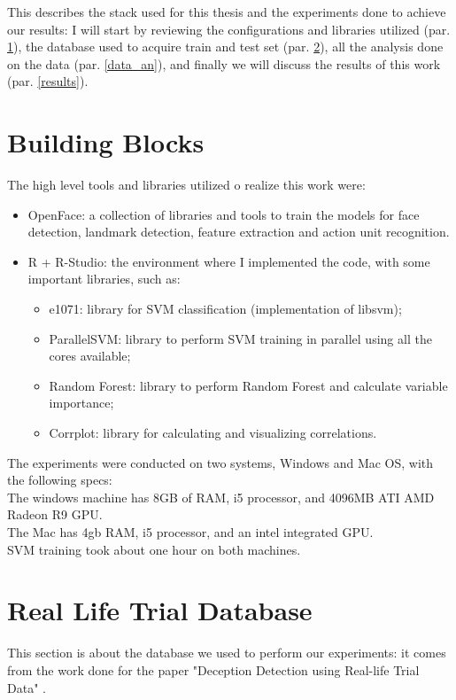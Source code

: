 This describes the stack used for this thesis and the experiments done to achieve our results: I will start by reviewing the configurations and libraries utilized (par. \ref{bb}), the database used to acquire train and test set (par. \ref{rldb}), all the analysis done on the data (par. \ref{data_an}), and finally we will discuss the results of this work (par. \ref{results}).

\section{Building Blocks} \label{bb}
The high level tools and libraries utilized o realize this work were:
\begin{itemize}
	\item OpenFace: a collection of libraries and tools to train the models for face detection, landmark detection, feature extraction and action unit recognition.
	\item R + R-Studio: the environment where I implemented the code, with some important libraries, such as:
	\begin{itemize}
		\item e1071: library for SVM classification (implementation of libsvm);
		\item ParallelSVM: library to perform SVM training in parallel using all the cores available;
		\item Random Forest: library to perform Random Forest and calculate variable importance;
		\item Corrplot: library for calculating and visualizing correlations.
	\end{itemize}
\end{itemize}

The experiments were conducted on two systems, Windows and Mac OS, with the following specs:\\
The windows machine has 8GB of RAM, i5 processor, and 4096MB ATI AMD Radeon R9 GPU. \\
The Mac has 4gb RAM, i5 processor, and an intel integrated GPU.\\
SVM training took about one hour on both machines.

\clearpage
\section{Real Life Trial Database} \label{rldb}
This section is about the database we used to perform our experiments: it comes from the work done for the paper "Deception Detection using Real-life Trial Data" \cite{Perez-Rosas:2015:DDU:2818346.2820758}.

